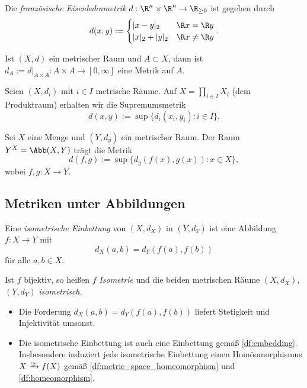 \begin{ex}
	Die \emph{französische Eisenbahnmetrik} $d: \R^n \times \R^n \to \R_{\ge 0}$ ist gegeben durch
	\[
		d(x,y) := \begin{cases}
			|x-y|_2 & \R x = \R y \\
			|x|_2 + |y|_2 & \R x \neq \R y
		\end{cases}.
	\]
\end{ex}

\begin{ex}[Teilräume]
	Ist $(X,d)$ ein metrischer Raum und $A \subset X$, dann ist $d_A := d\big|_{A\times A} : A \times A \to [0,\infty]$ eine Metrik auf $A$.
\end{ex}

\begin{ex}[Produkträume]
	Seien $(X,d_i)$ mit $i \in I$ metrische Räume.
	Auf $X = \prod_{i\in I} X_i$ (dem Produktraum) erhalten wir die Supremumsmetrik
	\[
		d(x,y) := \sup \{ d_i(x_i,y_i) : i \in I \}.
	\]
\end{ex}

\begin{ex}[Abbildungsräume]
	Sei $X$ eine Menge und $(Y,d_y)$ ein metrischer Raum.
	Der Raum $Y^X = \Abb(X,Y)$ trägt die Metrik
	\[
		d(f,g) := \sup \{ d_y(f(x),g(x)) : x \in X \},
	\]
	wobei $f,g : X \to Y$.
\end{ex}

\subsection{Metriken unter Abbildungen}

\begin{df}
	Eine \emph{isometrische Einbettung} von $(X,d_X)$ in $(Y,d_Y)$ ist eine Abbildung $f: X\to Y$ mit
	\[
		d_X(a,b) = d_Y(f(a), f(b))
	\]
	für alle $a,b \in X$.

	Ist $f$ bijektiv, so heißen $f$ \emph{Isometrie} und die beiden metrischen Räume $(X,d_X)$, $(Y,d_Y)$ \emph{isometrisch}.
	\begin{note}
		\begin{itemize}
			\item
				Die Forderung $d_X(a,b) = d_Y(f(a), f(b))$ liefert Stetigkeit und Injektivität umsonst.
			\item
				Die isometrische Einbettung ist auch eine Einbettung gemäß \ref{df:embedding}.
				Insbesondere induziert jede isometrische Einbettung einen Homöomorphismus $X \homto f(X)$ gemäß \ref{df:metric_space_homeomorphism} und \ref{df:homeomorphism}.
		\end{itemize}
	\end{note}
\end{df}

